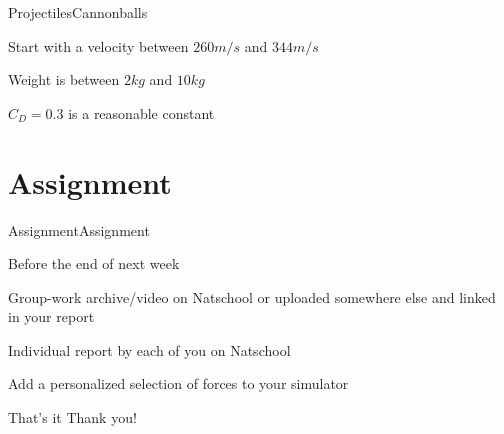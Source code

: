 \documentclass{beamer}
\begin{document}

\begin{slide}{Projectiles}{Cannonballs}{
\item Start with a velocity between $260m/s$ and $344m/s$
\item Weight is between $2kg$ and $10kg$
\item $C_D = 0.3$ is a reasonable constant
}\end{slide}


\section{Assignment}
\begin{slide}{Assignment}{Assignment}{
\item Before the end of next week
\item Group-work archive/video on Natschool or uploaded somewhere else and linked in your report
\item Individual report by each of you on Natschool
\item Add a personalized selection of forces to your simulator
}\end{slide}

\begin{frame}{That's it}
\center
\fontsize{18pt}{7.2}\selectfont
Thank you!
\end{frame}
\end{document}
